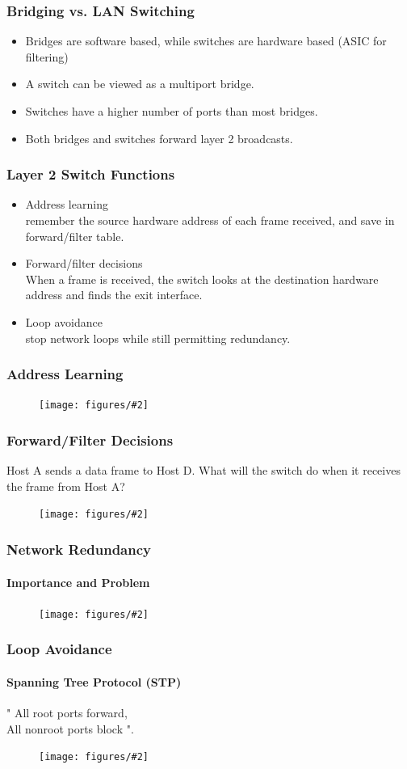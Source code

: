 \documentclass{beamer}
\newcommand{\fig}[2]{
\begin{center}
\begin{figure}
\texttt{[image: figures/\#2]}
\end{figure}
\end{center}
}
\begin{document}
\begin{frame}
\frametitle{\huge Bridging vs. LAN Switching} 
\Large
\begin{itemize} 
\item <1-> Bridges are software based, while switches are hardware based (ASIC for filtering)
\item <2-> A switch can be viewed as a multiport bridge.
\item <3-> Switches have a higher number of ports than most bridges.
\item <4-> Both bridges and switches forward layer 2 broadcasts.
\end{itemize}
\end{frame}


\begin{frame}
\frametitle{\huge Layer 2 Switch Functions} 
\Large
\begin{itemize} 
\item <1-> Address learning \\
remember the source hardware address of each frame received, and save in forward/filter table.
\item <2-> Forward/filter decisions \\
When a frame is received, the switch looks at the destination hardware address and finds the exit interface.
\item <3-> Loop avoidance \\
stop network loops while still permitting redundancy.
\end{itemize}
\end{frame}
  

\begin{frame}
\frametitle{\huge Address Learning} 
\fig{0.55}{network_swlearn}
\end{frame}


\begin{frame}
\frametitle{\huge Forward/Filter Decisions}
Host A sends a data frame to Host D. What will the switch do when it receives the frame from Host A? 
\fig{0.55}{network_filter}
\end{frame}

\begin{frame}
\frametitle{\huge Network Redundancy} 
\framesubtitle{Importance and Problem}
\fig{0.45}{network_redundancy}
\end{frame}


\begin{frame}
\frametitle{\huge Loop Avoidance} 
\framesubtitle{Spanning Tree Protocol (STP)}
\Large
" All root ports forward, \\ All nonroot ports block ".
\fig{0.6}{network_stp}
\end{frame}
\end{document}
